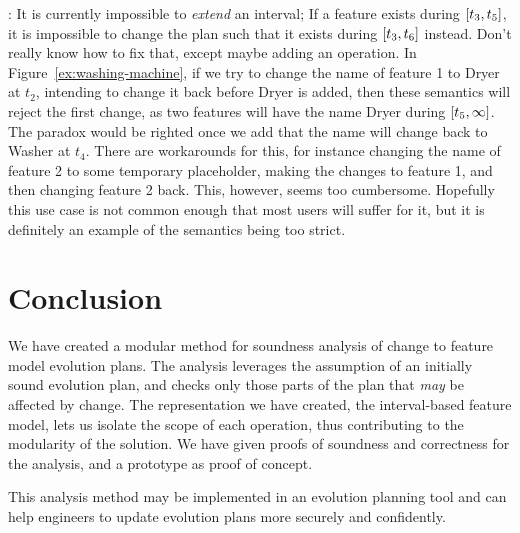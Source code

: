 : It is currently impossible to \emph{extend} an interval; If a feature exists during $\interval{t_3}{t_5}$, it is impossible to change the plan such that it exists during $\interval{t_3}{t_6}$ instead. Don't really know how to fix that, except maybe adding an operation. In Figure~\vref{ex:washing-machine}, if we try to change the name of feature 1 to Dryer at $t_2$, intending to change it back before Dryer is added, then these semantics will reject the first change, as two features will have the name Dryer during $\interval{t_5}{\forever}$. The paradox would be righted once we add that the name will change back to Washer at $t_4$. There are workarounds for this, for instance changing the name of feature 2 to some temporary placeholder, making the changes to feature 1, and then changing feature 2 back. This, however, seems too cumbersome. Hopefully this use case is not common enough that most users will suffer for it, but it is definitely an example of the semantics being too strict. 

\section{Conclusion}

We have created a modular method for soundness analysis of change to feature model evolution plans. The analysis leverages the assumption of an initially sound evolution plan, and checks only those parts of the plan that \emph{may} be affected by change. The representation we have created, the interval-based feature model, lets us isolate the scope of each operation, thus contributing to the modularity of the solution. We have given proofs of soundness and correctness for the analysis, and a prototype as proof of concept.

This analysis method may be implemented in an evolution planning tool and can help engineers to update evolution plans more securely and confidently.
